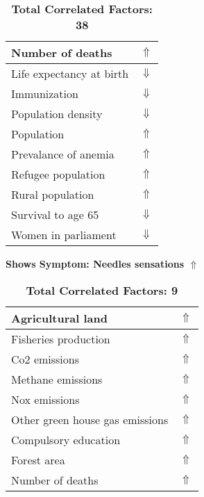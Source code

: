 \documentclass[12pt,notitlepage,oneside]{report}
\begin{document}
\begin{table}[!htb]
\begin{tabular}{|l|l|}
Number of deaths & $\Uparrow$\\ \hline
Life expectancy at birth & $\Downarrow$\\ \hline
Immunization & $\Downarrow$\\ \hline
Population density & $\Downarrow$\\ \hline
Population & $\Uparrow$\\ \hline
Prevalance of anemia & $\Uparrow$\\ \hline
Refugee population & $\Uparrow$\\ \hline
Rural population & $\Uparrow$\\ \hline
Survival to age 65 & $\Downarrow$\\ \hline
Women in parliament & $\Downarrow$\\ \hline
\end{tabular}
\caption*{\textbf{Total Correlated Factors: 38}}
\end{table}
\clearpage
\begin{table}[!htb]
\caption{\textbf{Shows Symptom: Needles sensations $\Uparrow$}}
\centering
\label{Correlated Socio-economic Factors0}
\begin{tabular}{|l|l|}
\hline
Agricultural land & $\Uparrow$\\ \hline
Fisheries production & $\Uparrow$\\ \hline
Co2 emissions & $\Uparrow$\\ \hline
Methane emissions & $\Uparrow$\\ \hline
Nox emissions & $\Uparrow$\\ \hline
Other green house gas emissions & $\Uparrow$\\ \hline
Compulsory education & $\Uparrow$\\ \hline
Forest area & $\Uparrow$\\ \hline
Number of deaths & $\Uparrow$\\ \hline
\end{tabular}
\caption*{\textbf{Total Correlated Factors: 9}}
\end{table}
\end{document}
